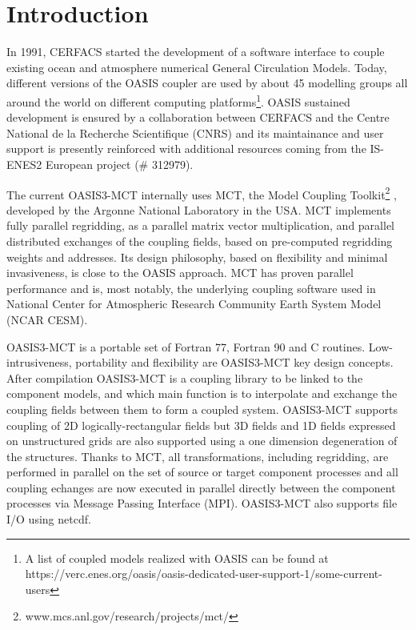 \newpage
\chapter{Introduction}
\label{sec_step}

In 1991, CERFACS started the development of
a software interface to couple existing ocean and atmosphere numerical General
Circulation Models. Today, different versions of the 
OASIS coupler are used by about 45 modelling groups all around the
world on different computing platforms\footnote{A list of
coupled models realized with OASIS can be found at https://verc.enes.org/oasis/oasis-dedicated-user-support-1/some-current-users}.
OASIS sustained development is ensured by a collaboration
between CERFACS and the Centre National de la Recherche Scientifique
(CNRS) and its maintainance and user support is presently reinforced
with additional resources coming from the IS-ENES2 European project (\# 312979).

The current OASIS3-MCT internally uses MCT, the Model
Coupling Toolkit\footnote{www.mcs.anl.gov/research/projects/mct/} \citep{mct_larson} \newline \citep{mct_jacob}, developed by the Argonne National Laboratory in the USA. MCT implements fully parallel regridding, as a parallel matrix vector 
multiplication, and parallel distributed exchanges of the coupling
fields, based on pre-computed regridding weights and addresses. 
Its design philosophy, based on flexibility and minimal invasiveness,
is close to the OASIS approach. 
MCT has proven parallel performance and is, most notably, the
underlying coupling software used in National Center for Atmospheric
Research Community Earth System Model (NCAR CESM).

OASIS3-MCT is a portable set of Fortran 77, Fortran 90 and C
routines. Low-intrusiveness, portability and flexibility are
OASIS3-MCT key design concepts. After compilation OASIS3-MCT is a
coupling library to be linked to the component models, and which main
function is to interpolate and exchange the coupling fields between
them to form a coupled system.  OASIS3-MCT supports  coupling of 2D
logically-rectangular fields but 3D fields and 1D fields expressed on
unstructured grids are also supported using a one dimension
degeneration of the structures. Thanks to MCT, all transformations,
including regridding, are performed in parallel on the set of source or
target component processes and all coupling echanges are now executed
in parallel directly between the component processes via Message Passing Interface
(MPI). OASIS3-MCT also supports file I/O using netcdf. 

